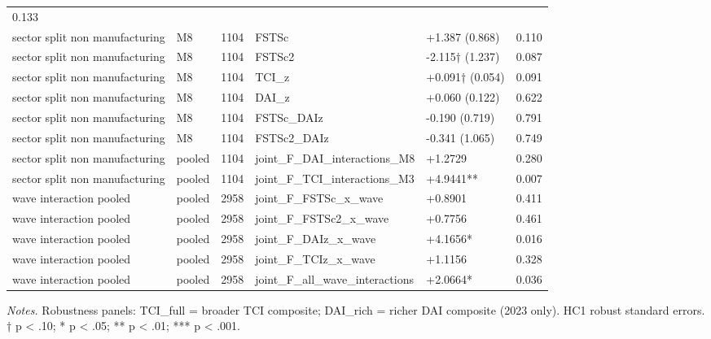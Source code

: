 \documentclass[12pt,a4paper]{article}
\begin{document}
\begin{longtable}[]{@{}llllll@{}}
0.133 \\
sector split non manufacturing & M8 & 1104 & FSTSc & +1.387 (0.868) &
0.110 \\
sector split non manufacturing & M8 & 1104 & FSTSc2 & -2.115† (1.237) &
0.087 \\
sector split non manufacturing & M8 & 1104 & TCI\_z & +0.091† (0.054) &
0.091 \\
sector split non manufacturing & M8 & 1104 & DAI\_z & +0.060 (0.122) &
0.622 \\
sector split non manufacturing & M8 & 1104 & FSTSc\_DAIz & -0.190
(0.719) & 0.791 \\
sector split non manufacturing & M8 & 1104 & FSTSc2\_DAIz & -0.341
(1.065) & 0.749 \\
sector split non manufacturing & pooled & 1104 &
joint\_F\_DAI\_interactions\_M8 & +1.2729 & 0.280 \\
sector split non manufacturing & pooled & 1104 &
joint\_F\_TCI\_interactions\_M3 & +4.9441** & 0.007 \\
wave interaction pooled & pooled & 2958 & joint\_F\_FSTSc\_x\_wave &
+0.8901 & 0.411 \\
wave interaction pooled & pooled & 2958 & joint\_F\_FSTSc2\_x\_wave &
+0.7756 & 0.461 \\
wave interaction pooled & pooled & 2958 & joint\_F\_DAIz\_x\_wave &
+4.1656* & 0.016 \\
wave interaction pooled & pooled & 2958 & joint\_F\_TCIz\_x\_wave &
+1.1156 & 0.328 \\
wave interaction pooled & pooled & 2958 &
joint\_F\_all\_wave\_interactions & +2.0664* & 0.036 \\
\end{longtable}

\emph{Notes.} Robustness panels: TCI\_full = broader TCI composite;
DAI\_rich = richer DAI composite (2023 only). HC1 robust standard
errors. † p \textless{} .10; * p \textless{} .05; ** p \textless{} .01;
*** p \textless{} .001.
\end{document}
